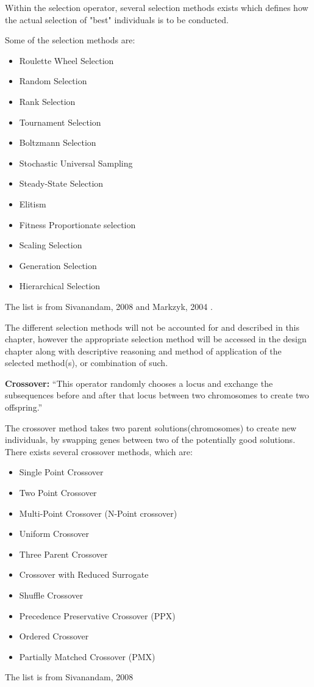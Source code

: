 Within the selection operator, several selection methods exists which defines how the actual selection of "best" individuals is to be conducted.

Some of the selection methods are:
\begin{itemize}
\item Roulette Wheel Selection
\item Random Selection
\item Rank Selection
\item Tournament Selection
\item Boltzmann Selection
\item Stochastic Universal Sampling
\item Steady-State Selection
\item Elitism
\item Fitness Proportionate selection
\item Scaling Selection
\item Generation Selection
\item Hierarchical Selection
\end{itemize}
The list is from Sivanandam, 2008 \cite[pp. 46-50]{Sivanandam2008} and Markzyk, 2004 \cite{Adam2004}.

The different selection methods will not be accounted for and described in this chapter, however the appropriate selection method will be accessed in the design chapter along with descriptive reasoning and method of application of the selected method(s), or combination of such.

\textbf{Crossover:} \enquote{This operator randomly chooses a locus and exchange the subsequences before and after that locus between two chromosomes to create two offspring.} \cite[pp. 8]{Melanie1990}

The crossover method takes two parent solutions(chromosomes) to create new individuals, by swapping genes between two of the potentially good solutions. There exists several crossover methods, which are:


\begin{itemize}
\item Single Point Crossover
\item Two Point Crossover
\item Multi-Point Crossover (N-Point crossover)
\item Uniform Crossover
\item Three Parent Crossover
\item Crossover with Reduced Surrogate
\item Shuffle Crossover
\item Precedence Preservative Crossover (PPX)
\item Ordered Crossover
\item Partially Matched Crossover (PMX)
\end{itemize}
The list is from Sivanandam, 2008 \cite[pp. 50-56]{Sivanandam2008}


